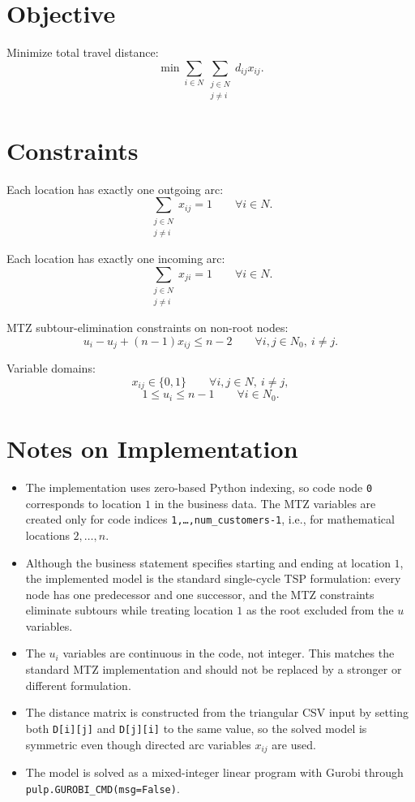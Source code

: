 \section*{Objective}

Minimize total travel distance:
\[
\min \sum_{i \in N}\sum_{\substack{j \in N\\ j \neq i}} d_{ij} x_{ij}.
\]

\section*{Constraints}

Each location has exactly one outgoing arc:
\[
\sum_{\substack{j \in N\\ j \neq i}} x_{ij} = 1
\qquad \forall i \in N.
\]

Each location has exactly one incoming arc:
\[
\sum_{\substack{j \in N\\ j \neq i}} x_{ji} = 1
\qquad \forall i \in N.
\]

MTZ subtour-elimination constraints on non-root nodes:
\[
u_i - u_j + (n-1)x_{ij} \le n-2
\qquad \forall i,j \in N_0,\ i \neq j.
\]

Variable domains:
\[
x_{ij} \in \{0,1\}
\qquad \forall i,j \in N,\ i \neq j,
\]
\[
1 \le u_i \le n-1
\qquad \forall i \in N_0.
\]

\section*{Notes on Implementation}

\begin{itemize}
    \item The implementation uses zero-based Python indexing, so code node \texttt{0} corresponds to location $1$ in the business data. The MTZ variables are created only for code indices \texttt{1,\dots,num\_customers-1}, i.e., for mathematical locations $2,\dots,n$.
    \item Although the business statement specifies starting and ending at location $1$, the implemented model is the standard single-cycle TSP formulation: every node has one predecessor and one successor, and the MTZ constraints eliminate subtours while treating location $1$ as the root excluded from the $u$ variables.
    \item The $u_i$ variables are continuous in the code, not integer. This matches the standard MTZ implementation and should not be replaced by a stronger or different formulation.
    \item The distance matrix is constructed from the triangular CSV input by setting both \texttt{D[i][j]} and \texttt{D[j][i]} to the same value, so the solved model is symmetric even though directed arc variables $x_{ij}$ are used.
    \item The model is solved as a mixed-integer linear program with Gurobi through \texttt{pulp.GUROBI\_CMD(msg=False)}.
\end{itemize}
